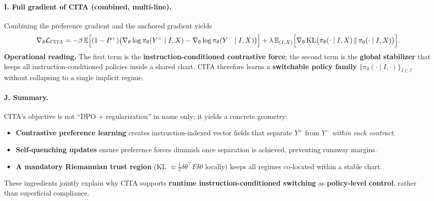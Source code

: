 \vspace{-0.35em}
\paragraph{\textbf{I. Full gradient of CITA (combined, multi-line).}}
Combining the preference gradient and the anchored gradient yields
\[
\nabla_\theta \mathcal{L}_{\textsc{CITA}}
=
-\beta\,
\mathbb{E}
\Big[
(1-P^+)\big(
\nabla_\theta\log\pi_\theta(Y^+\mid I,X)-\nabla_\theta\log\pi_\theta(Y^-\mid I,X)
\big)
\Big]
+
\lambda\,
\mathbb{E}_{(I,X)}
\Big[
\nabla_\theta\,\mathrm{KL}\big(\pi_\theta(\cdot\mid I,X)\,\|\,\pi_0(\cdot\mid I,X)\big)
\Big].
\]
\textbf{Operational reading.} The first term is the \textbf{instruction-conditioned contrastive force}; the second term is the \textbf{global stabilizer} that keeps all instruction-conditioned policies inside a shared chart.
CITA therefore learns a \textbf{switchable policy family} $\{\pi_\theta(\cdot\mid I,\cdot)\}_{I\in\mathcal{I}}$ without collapsing to a single implicit regime.

\vspace{-0.35em}
\paragraph{\textbf{J. Summary.}}
CITA’s objective is not ``DPO + regularization'' in name only; it yields a concrete geometry:
\begin{itemize}
\item \textbf{Contrastive preference learning} creates instruction-indexed vector fields that separate $Y^+$ from $Y^-$ \emph{within each contract}.
\item \textbf{Self-quenching updates} ensure preference forces diminish once separation is achieved, preventing runaway margins.
\item \textbf{A mandatory Riemannian trust region} (KL $\approx \tfrac12\delta\theta^\top F\delta\theta$ locally) keeps all regimes co-located within a stable chart.
\end{itemize}
These ingredients jointly explain why CITA supports \textbf{runtime instruction-conditioned switching} as \textbf{policy-level control}, rather than superficial compliance.





